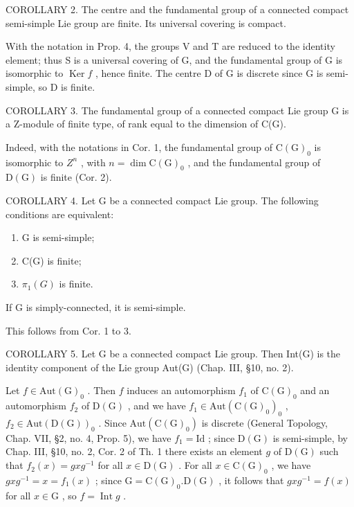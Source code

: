 COROLLARY 2. The centre and the fundamental group of a connected compact semi-simple Lie group are finite. Its universal covering is compact.

With the notation in Prop. 4, the groups V and T are reduced to the identity element; thus S is a universal covering of G, and the fundamental group of G is isomorphic to \(\operatorname{Ker} f\) , hence finite. The centre D of G is discrete since G is semi-simple, so D is finite.

COROLLARY 3. The fundamental group of a connected compact Lie group G is a Z-module of finite type, of rank equal to the dimension of C(G).

Indeed, with the notations in Cor. 1, the fundamental group of \(\mathrm{C}(\mathrm{G})_{0}\) is isomorphic to \(Z^{n}\) , with \(n = \dim \mathrm{C}(\mathrm{G})_{0}\) , and the fundamental group of \(\mathrm{D}(\mathrm{G})\) is finite (Cor. 2).

COROLLARY 4. Let G be a connected compact Lie group. The following conditions are equivalent:

\begin{enumerate}
\def\labelenumi{(\roman{enumi})}
\item
  G is semi-simple;
\item
  C(G) is finite;
\item
  \(\pi_{1}(G)\) is finite.
\end{enumerate}

If \(\mathrm{G}\) is simply-connected, it is semi-simple.

This follows from Cor. 1 to 3.

COROLLARY 5. Let G be a connected compact Lie group. Then Int(G) is the identity component of the Lie group Aut(G) (Chap. III, §10, no. 2).

Let \(f \in \mathrm{Aut}(\mathrm{G})_0\) . Then \(f\) induces an automorphism \(f_1\) of \(\mathrm{C}(\mathrm{G})_0\) and an automorphism \(f_2\) of \(\mathrm{D}(\mathrm{G})\) , and we have \(f_1 \in \mathrm{Aut}(\mathrm{C}(\mathrm{G})_0)_0\) , \(f_2 \in \mathrm{Aut}(\mathrm{D}(\mathrm{G}))_0\) . Since \(\mathrm{Aut}(\mathrm{C}(\mathrm{G})_0)\) is discrete (General Topology, Chap. VII, §2, no. 4, Prop. 5), we have \(f_1 = \mathrm{Id}\) ; since \(\mathrm{D}(\mathrm{G})\) is semi-simple, by Chap. III, §10, no. 2, Cor. 2 of Th. 1 there exists an element \(g\) of \(\mathrm{D}(\mathrm{G})\) such that \(f_2(x) = g x g^{-1}\) for all \(x \in \mathrm{D}(\mathrm{G})\) . For all \(x \in \mathrm{C}(\mathrm{G})_0\) , we have \(g x g^{-1} = x = f_1(x)\) ; since \(\mathrm{G} = \mathrm{C}(\mathrm{G})_0.\mathrm{D}(\mathrm{G})\) , it follows that \(g x g^{-1} = f(x)\) for all \(x \in \mathrm{G}\) , so \(f = \operatorname{Int} g\) .

